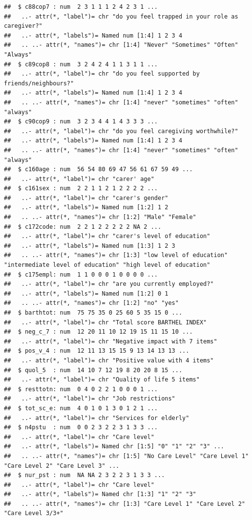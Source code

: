 \documentclass[
]{article}
\begin{document}
\begin{verbatim}
##  $ c88cop7 : num  2 3 1 1 1 2 4 2 3 1 ...
##   ..- attr(*, "label")= chr "do you feel trapped in your role as caregiver?"
##   ..- attr(*, "labels")= Named num [1:4] 1 2 3 4
##   .. ..- attr(*, "names")= chr [1:4] "Never" "Sometimes" "Often" "Always"
##  $ c89cop8 : num  3 2 4 2 4 1 1 3 1 1 ...
##   ..- attr(*, "label")= chr "do you feel supported by friends/neighbours?"
##   ..- attr(*, "labels")= Named num [1:4] 1 2 3 4
##   .. ..- attr(*, "names")= chr [1:4] "never" "sometimes" "often" "always"
##  $ c90cop9 : num  3 2 3 4 4 1 4 3 3 3 ...
##   ..- attr(*, "label")= chr "do you feel caregiving worthwhile?"
##   ..- attr(*, "labels")= Named num [1:4] 1 2 3 4
##   .. ..- attr(*, "names")= chr [1:4] "never" "sometimes" "often" "always"
##  $ c160age : num  56 54 80 69 47 56 61 67 59 49 ...
##   ..- attr(*, "label")= chr "carer' age"
##  $ c161sex : num  2 2 1 1 2 1 2 2 2 2 ...
##   ..- attr(*, "label")= chr "carer's gender"
##   ..- attr(*, "labels")= Named num [1:2] 1 2
##   .. ..- attr(*, "names")= chr [1:2] "Male" "Female"
##  $ c172code: num  2 2 1 2 2 2 2 2 NA 2 ...
##   ..- attr(*, "label")= chr "carer's level of education"
##   ..- attr(*, "labels")= Named num [1:3] 1 2 3
##   .. ..- attr(*, "names")= chr [1:3] "low level of education" "intermediate level of education" "high level of education"
##  $ c175empl: num  1 1 0 0 0 1 0 0 0 0 ...
##   ..- attr(*, "label")= chr "are you currently employed?"
##   ..- attr(*, "labels")= Named num [1:2] 0 1
##   .. ..- attr(*, "names")= chr [1:2] "no" "yes"
##  $ barthtot: num  75 75 35 0 25 60 5 35 15 0 ...
##   ..- attr(*, "label")= chr "Total score BARTHEL INDEX"
##  $ neg_c_7 : num  12 20 11 10 12 19 15 11 15 10 ...
##   ..- attr(*, "label")= chr "Negative impact with 7 items"
##  $ pos_v_4 : num  12 11 13 15 15 9 13 14 13 13 ...
##   ..- attr(*, "label")= chr "Positive value with 4 items"
##  $ quol_5  : num  14 10 7 12 19 8 20 20 8 15 ...
##   ..- attr(*, "label")= chr "Quality of life 5 items"
##  $ resttotn: num  0 4 0 2 2 1 0 0 0 1 ...
##   ..- attr(*, "label")= chr "Job restrictions"
##  $ tot_sc_e: num  4 0 1 0 1 3 0 1 2 1 ...
##   ..- attr(*, "label")= chr "Services for elderly"
##  $ n4pstu  : num  0 0 2 3 2 2 3 1 3 3 ...
##   ..- attr(*, "label")= chr "Care level"
##   ..- attr(*, "labels")= Named chr [1:5] "0" "1" "2" "3" ...
##   .. ..- attr(*, "names")= chr [1:5] "No Care Level" "Care Level 1" "Care Level 2" "Care Level 3" ...
##  $ nur_pst : num  NA NA 2 3 2 2 3 1 3 3 ...
##   ..- attr(*, "label")= chr "Care level"
##   ..- attr(*, "labels")= Named chr [1:3] "1" "2" "3"
##   .. ..- attr(*, "names")= chr [1:3] "Care Level 1" "Care Level 2" "Care Level 3/3+"
\end{verbatim}
\end{document}
